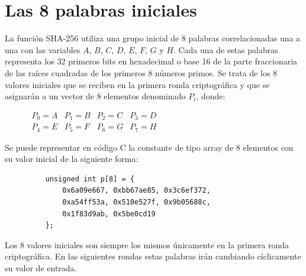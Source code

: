 \documentclass{article}
\begin{document}
\section{Las 8 palabras iniciales}
    La función SHA-256 utiliza una grupo inicial de 8 palabras correlacionadas una a una con las variables $A$, $B$, $C$, $D$, $E$, $F$, $G$ y $H$. Cada una de estas palabras representa los 32 primeros bits en hexadecimal o base 16 de la parte fraccionaria de las raíces cuadradas de los primeros 8 números primos. Se trata de los 8 valores iniciales que se reciben en la primera ronda criptográfica y que se asignarán a un vector de 8 elementos denominado $P_{t}$, donde:
        \begin{figure}[H]
        \centering
            $\begin{array}{llll}
                P_{0} = A & P_{1} = B & P_{2} = C & P_{3} = D \\
                P_{4} = E & P_{5} = F & P_{6} = G & P_{7} = H
            \end{array}$
        \end{figure}
    
    Se puede representar en código C la constante de tipo array de 8 elementos con su valor inicial de la siguiente forma:
        \begin{figure}[H]
        \centering
            \begin{verbatim}
    unsigned int p[8] = {
    	0x6a09e667, 0xbb67ae85, 0x3c6ef372,
    	0xa54ff53a, 0x510e527f, 0x9b05688c,
    	0x1f83d9ab, 0x5be0cd19
    };
            \end{verbatim}
        \end{figure}
    
    Los 8 valores iniciales son siempre los mismos únicamente en la primera ronda criptográfica. En las siguientes rondas estas palabras irán cambiando cíclicamente su valor de entrada.
    
\end{document}
